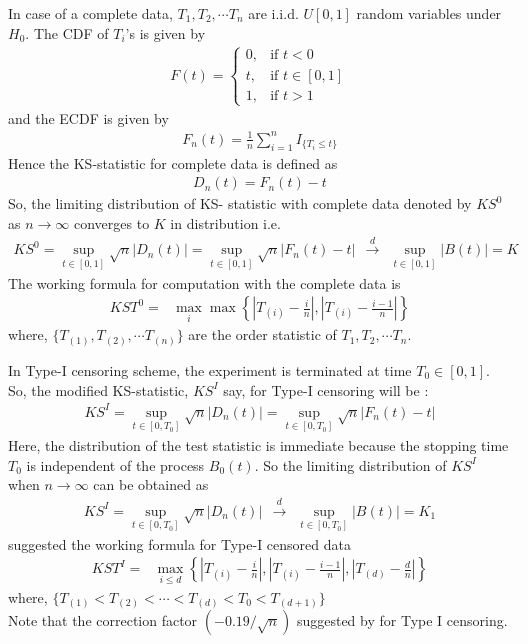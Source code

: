 \documentclass[12pt, reqno]{amsart}
\begin{document}
 In case of a complete data, $T_1, T_2,\cdots T_n$ are i.i.d. $U[0,1]$ random variables under $H_0$.  The CDF of $T_i$'s is given by 
\begin{align}
    F(t)=\begin{cases}
0, & \text{if }t<0\\
t, & \text{if }t\in[0,1]\\
1, & \text{if }t>1
\end{cases}
\end{align} and the  ECDF  is given by 
 \begin{align}
   F_n(t)=\frac{1}{n}\displaystyle\sum_{i=1}^n I_{\{T_i\leq t\}}     
 \end{align}
Hence the  KS-statistic for complete data is defined as
 \begin{align}
       D_n(t)= F_n(t)-t
 \end{align}
 So, the limiting distribution of KS- statistic with complete data  denoted by $KS^{0}$ as  $ n\rightarrow \infty$ converges to $K$ in distribution i.e. 
 \begin{align}
  KS^0={\displaystyle\sup_{t\in[0,1]}\sqrt{n}|D_n(t)|=\sup_{t\in[0,1]}\sqrt{n}|F_n(t)-t|   ~~ \xrightarrow{d} ~~ \sup _{t\in [0,1]}|B(t)|}=K   
 \end{align}
The working formula for computation with the  complete data is 
\begin{align}
KST^0= ~~~{\displaystyle\max_i \max \left\{|T_{(i)}-\frac{i}{n}|,|T_{(i)}-\frac{i-1}{n}|\right\}} \label{kst0}
\end{align}
where, $\{T_{(1)}, T_{(2)},\cdots T_{(n)}\}$ are  the order statistic of   $T_1, T_2,\cdots T_n.$
 
In Type-I censoring scheme, the experiment is terminated at time $T_{0} \in [0, 1]$. So, the modified KS-statistic, $KS^{I}$ say, for Type-I censoring will be :
\begin{align}
    KS^{I} ={\displaystyle \sup _{t\in [0,T_{0}]}{\displaystyle {\sqrt {n}}|D_{n}(t)|}  =\sup _{t\in [0,T_{0}]} \sqrt{n}|F_{n}(t)-t|} 
\end{align}
Here, the distribution of the test statistic is immediate because the stopping time $T_{0}$ is independent
of the process $B_{0}(t)$. So the limiting distribution of $KS^{I}$ when   $ n\rightarrow \infty$ can be obtained  as
\begin{align}
     KS^{I} ={\displaystyle \sup _{t\in [0,T_{0}]}{\displaystyle {\sqrt {n}}|D_{n}(t)|} ~~ \xrightarrow{d} ~~ {\displaystyle \sup _{t\in [0,T_{0}]}|B(t)|=K_1  }}  
\end{align}
\cite{Dufour_1978} suggested  the working formula for Type-I censored data
\begin{align}
    KST^I=~~~\displaystyle\max_{i\leq d}\left\{|T_{(i)}-\frac{i}{n}|,|T_{(i)}-\frac{i-1}{n}|,|T_{(d)}-\frac{d}{n}|\right\} \label{kst1}
    \end{align}
where, $\{T_{(1)}< T_{(2)}<\cdots< T_{(d)}<T_0<T_{(d+1)}\}$\\
Note that the correction factor $(-0.19/\sqrt{n})$  suggested by \cite{Koziol} for Type I censoring.
\end{document}
